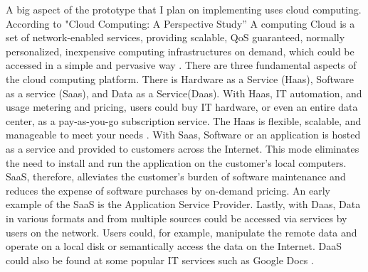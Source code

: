A big aspect of the prototype that I plan on implementing uses cloud computing. According to "Cloud Computing: A Perspective Study'' A computing Cloud is a set of network-enabled services, providing scalable, QoS guaranteed, normally personalized, inexpensive computing infrastructures on demand, which could be accessed in a simple and pervasive way \cite{wang2010cloud}. There are three fundamental aspects of the cloud computing platform. There is Hardware as a Service (Haas), Software as a service (Saas), and Data as a Service(Daas). With Haas, IT automation, and usage metering and pricing, users could buy IT hardware, or even an entire data center, as a pay-as-you-go subscription service. The Haas is flexible, scalable, and manageable to meet your needs \cite{wang2010cloud}. With Saas, Software or an application is hosted as a service and provided to customers across the Internet. This mode eliminates the need to install and run the application on the customer’s local computers. SaaS, therefore, alleviates the customer’s burden of software maintenance and reduces the expense of software purchases by on-demand pricing. An early example of the SaaS is the Application Service Provider. Lastly, with Daas, Data in various formats and from multiple sources could be accessed via services by users on the network. Users could, for example, manipulate the remote data and operate on a local disk or semantically access the data on the Internet. DaaS could also be found at some popular IT services such as Google Docs \cite{wang2010cloud}.


